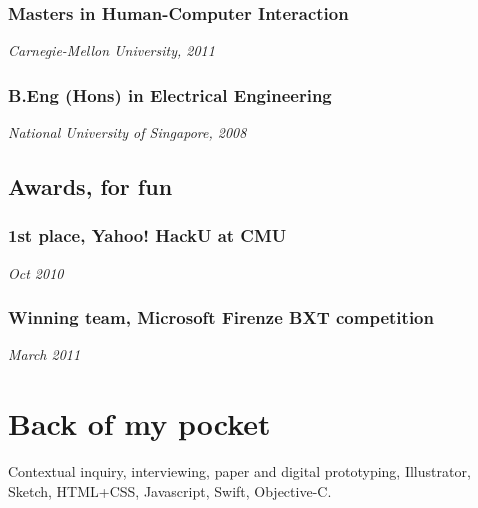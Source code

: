 \subsubsection[masters-in-human-computer-interaction]{Masters in
Human-Computer Interaction}

{\em Carnegie-Mellon University, 2011}

\subsubsection[b.eng-hons-in-electrical-engineering]{B.Eng (Hons) in
Electrical Engineering}

{\em National University of Singapore, 2008}

\subsection[awards-for-fun]{Awards, for fun}

\subsubsection[st-place-yahoo-hacku-at-cmu]{1st place, Yahoo! HackU at
CMU}

{\em Oct 2010}

\subsubsection[winning-team-microsoft-firenze-bxt-competition]{Winning
team, Microsoft Firenze BXT competition}

{\em March 2011}

\section[back-of-my-pocket]{Back of my pocket}

Contextual inquiry, interviewing, paper and digital prototyping,
Illustrator, Sketch, HTML+CSS, Javascript, Swift, Objective-C.

